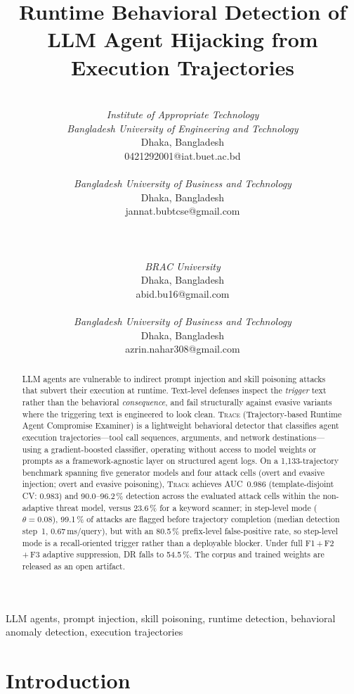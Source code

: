 \documentclass[conference]{IEEEtran}
\title{Runtime Behavioral Detection of LLM Agent Hijacking from Execution Trajectories}
\author{\parbox[t]{0.46\textwidth}{\centering{\large Debashis Kar Suvra}\\[2pt]{\normalsize \textit{Institute of Appropriate Technology}\\\textit{Bangladesh University of Engineering and Technology}\\Dhaka, Bangladesh\\0421292001@iat.buet.ac.bd}}\hfill\parbox[t]{0.46\textwidth}{\centering{\large Jannatul Ferdous Modina}\\[2pt]{\normalsize \textit{Bangladesh University of Business and Technology}\\Dhaka, Bangladesh\\jannat.bubtcse@gmail.com}}\\[10pt]
\parbox[t]{0.46\textwidth}{\centering{\large MD Bakhtiar Abid}\\[2pt]{\normalsize \textit{BRAC University}\\Dhaka, Bangladesh\\abid.bu16@gmail.com}}\hfill\parbox[t]{0.46\textwidth}{\centering{\large Azrin Nahar Anika}\\[2pt]{\normalsize \textit{Bangladesh University of Business and Technology}\\Dhaka, Bangladesh\\azrin.nahar308@gmail.com}}}
\begin{document}
\maketitle

\begin{abstract}
LLM agents are vulnerable to indirect prompt injection and skill
poisoning attacks that subvert their execution at runtime.
Text-level defenses inspect the \emph{trigger} text rather than the
behavioral \emph{consequence}, and fail structurally against evasive
variants where the triggering text is engineered to look clean.
\textsc{Trace} (Trajectory-based Runtime Agent Compromise
Examiner) is a lightweight behavioral detector that classifies agent
execution trajectories---tool call sequences, arguments, and network
destinations---using a gradient-boosted classifier, operating without
access to model weights or prompts as a framework-agnostic layer on
structured agent logs.
On a 1{,}133-trajectory benchmark spanning five generator models and
four attack cells (overt and evasive injection; overt and evasive
poisoning), \textsc{Trace} achieves AUC~0.986
(template-disjoint CV: 0.983) and 90.0--96.2\,\% detection across
the evaluated attack cells within the non-adaptive threat model,
versus 23.6\,\% for a keyword scanner; in step-level mode ($\theta{=}0.08$), 99.1\,\%
of attacks are flagged before trajectory completion (median detection
step~1, 0.67\,ms/query), but with an 80.5\,\% prefix-level false-positive
rate, so step-level mode is a recall-oriented trigger rather than a
deployable blocker.  Under full F1\,+\,F2\,+\,F3 adaptive
suppression, DR falls to 54.5\,\%.
The corpus and trained weights are released as an open artifact.
\end{abstract}

\begin{IEEEkeywords}
LLM agents, prompt injection, skill poisoning, runtime detection, behavioral anomaly detection, execution trajectories
\end{IEEEkeywords}

\section{Introduction}
\label{sec:intro}
\end{document}
